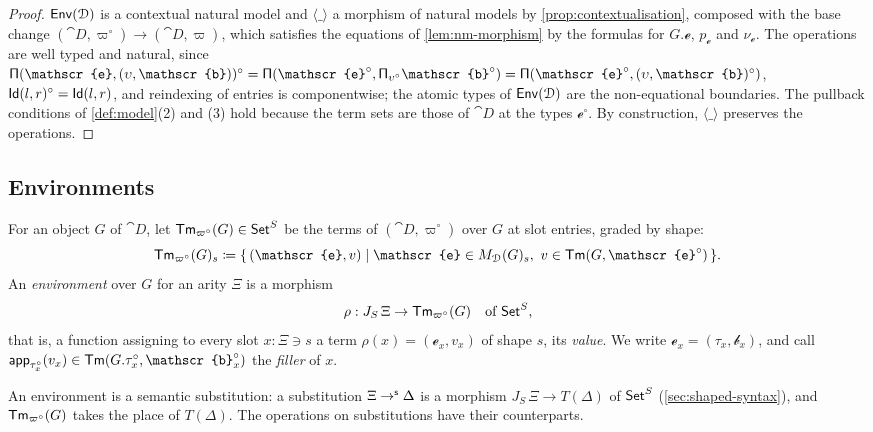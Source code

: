 \begin{proof}
    $\mathsf{Env}(\mathcal{D})$ is a contextual natural model and $\langle \_ \rangle$ a morphism of natural models by \cref{prop:contextualisation}, composed with the base change $(\cat{D}, \varpi^{\circ}) \to (\cat{D}, \varpi)$, which satisfies the equations of \cref{lem:nm-morphism} by the formulas for $G.\mathscr{e}$, $p_{\mathscr{e}}$ and $\nu_{\mathscr{e}}$. The operations are well typed and natural, since $\PiT(\mathscr{e}, (\upsilon, \mathscr{b}))^{\circ} = \PiT(\mathscr{e}^{\circ}, \PiT_{\upsilon^{\circ}} \mathscr{b}^{\circ}) = \PiT(\mathscr{e}^{\circ}, (\upsilon, \mathscr{b})^{\circ})$, $\mathsf{Id}(l, r)^{\circ} = \mathsf{Id}(l, r)$, and reindexing of entries is componentwise; the atomic types of $\mathsf{Env}(\mathcal{D})$ are the non-equational boundaries. The pullback conditions of \cref{def:model}(2) and (3) hold because the term sets are those of $\cat{D}$ at the types $\mathscr{e}^{\circ}$. By construction, $\langle \_ \rangle$ preserves the operations.
\end{proof}

\subsection{Environments}
\label{sec:environments}

\begin{definition}\label{def:environment}
    For an object $G$ of $\cat{D}$, let $\mathsf{Tm}_{\varpi^{\circ}}(G) \in \mathsf{Set}^S$ be the terms of $(\cat{D}, \varpi^{\circ})$ over $G$ at slot entries, graded by shape:
    \[
        \Tm_{\varpi^{\circ}}(G)_s \coloneqq \{\, (\mathscr{e}, v) \mid \mathscr{e} \in M_{\cat{D}}(G)_s,\ v \in \Tm(G, \mathscr{e}^{\circ}) \,\}.
    \]
    An \emph{environment} over $G$ for an arity $\Xi$ is a morphism
    \[
        \rho : J_S\,\Xi \to \mathsf{Tm}_{\varpi^{\circ}}(G) \quad \text{of } \mathsf{Set}^S,
    \]
    that is, a function assigning to every slot $x : \Xi \ni s$ a term $\rho(x) = (\mathscr{e}_x, v_x)$ of shape $s$, its \emph{value}. We write $\mathscr{e}_x = (\tau_x, \mathscr{b}_x)$, and call $\app_{\tau_x^{\circ}}(v_x) \in \Tm(G.\tau_x^{\circ}, \mathscr{b}_x^{\circ})$ the \emph{filler} of $x$.
\end{definition}

An environment is a semantic substitution: a substitution $\Xi \to^{\mathsf{s}} \Delta$ is a morphism $J_S\,\Xi \to T(\Delta)$ of $\mathsf{Set}^S$ (\cref{sec:shaped-syntax}), and $\mathsf{Tm}_{\varpi^{\circ}}(G)$ takes the place of $T(\Delta)$. The operations on substitutions have their counterparts.

